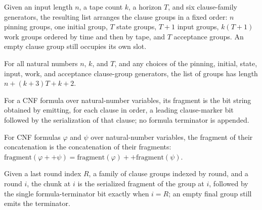 \begin{definition}
\label{Complexity.clGroups}
\leanok
Given an input length $n$, a tape count $k$, a horizon $T$, and six clause-family generators, the resulting list arranges the clause groups in a fixed order: $n$ pinning groups, one initial group, $T$ state groups, $T+1$ input groups, $k(T+1)$ work groups ordered by time and then by tape, and $T$ acceptance groups. An empty clause group still occupies its own slot.
\end{definition}

\begin{lemma}
\label{Complexity.clGroups_length}
\leanok
{}
For all natural numbers $n$, $k$, and $T$, and any choices of the pinning, initial,
state, input, work, and acceptance clause-group generators, the list of groups has
length $n+(k+3)T+k+2$.
\end{lemma}

\begin{definition}
\label{Complexity.clFragment}
\leanok
{}
For a CNF formula over natural-number variables, its fragment is the bit string obtained by emitting, for each clause in order, a leading clause-marker bit followed by the serialization of that clause; no formula terminator is appended.
\end{definition}

\begin{lemma}
\label{Complexity.clFragment_append}
\leanok
{}
For CNF formulas $\varphi$ and $\psi$ over natural-number variables, the fragment of
their concatenation is the concatenation of their fragments: $\mathrm{fragment}(\varphi
++ \psi)=\mathrm{fragment}(\varphi) ++ \mathrm{fragment}(\psi)$.
\end{lemma}

\begin{definition}
\label{Complexity.clChunk}
\leanok
{}
Given a last round index $R$, a family of clause groups indexed by round, and a round $i$, the chunk at $i$ is the serialized fragment of the group at $i$, followed by the single formula-terminator bit exactly when $i = R$; an empty final group still emits the terminator.
\end{definition}

